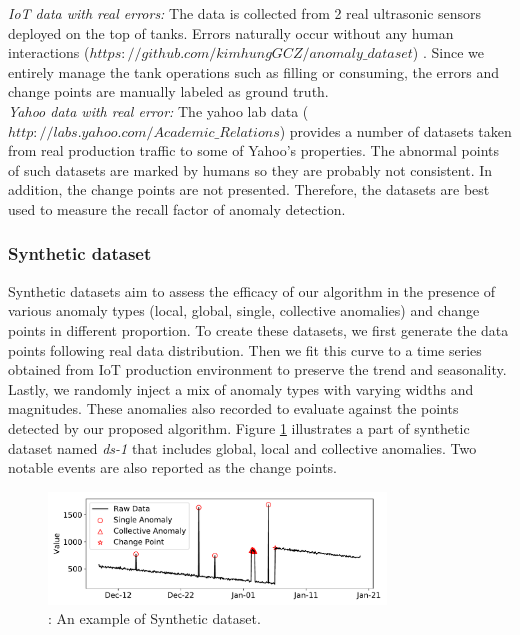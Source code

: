 \textit{IoT data with real errors:} The data is collected from 2 real ultrasonic sensors deployed on the top of tanks. Errors naturally occur without any human interactions ($ https://github.com/kimhungGCZ/anomaly\_dataset $) . Since we entirely manage the tank operations such as filling or consuming, the errors and change points are manually labeled as ground truth. \\

\textit{Yahoo data with real error:} The yahoo lab data ($ http://labs.yahoo.com/Academic\_Relations $) provides a number of datasets taken from real production traffic to some of Yahoo's properties. The abnormal points of such datasets are marked by humans so they are probably not consistent. In addition, the change points are not presented. Therefore, the datasets are best used to measure the recall factor of anomaly detection.

\subsubsection{Synthetic dataset}
Synthetic datasets aim to assess the efficacy of our algorithm in the presence of various anomaly types (local, global, single, collective anomalies) and change points in different proportion. To create these datasets, we first generate the data points following real data distribution. Then we fit this curve to a time series obtained from IoT production environment to preserve the trend and seasonality. Lastly, we randomly inject a mix of anomaly types with varying widths and magnitudes. These anomalies also recorded to evaluate against the points detected by our proposed algorithm. Figure \ref{fig: data_1_ex} illustrates a part of synthetic dataset named \textit{ds-1} that includes global, local and collective anomalies. Two notable events are also reported as the change points. 

\begin{figure}[H]
	\centering
	\includegraphics[width=0.8\textwidth]{Part3/Chapter7/figures/data_1_ex.pdf}
	\caption{ : An example of Synthetic dataset.}
	\label{fig: data_1_ex}
\end{figure}

